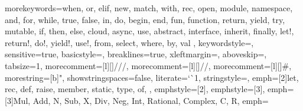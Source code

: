 




%
{
  morekeywords={when, or, elif, new, match, with, rec, open, module, namespace, %
    and, for, while, true, false, in, do, begin, end, fun, function, return, yield, try, %
    mutable, if, then, else, cloud, async, use, abstract, interface, inherit, finally,
    let!, return!, do!, yield!, use!, from, select, where, by, val },
  keywordstyle=\color{codepurple},
  sensitive=true,
  basicstyle=\ttfamily\footnotesize,
  breaklines=true,
  xleftmargin=\parindent,
  aboveskip=\bigskipamount,
  tabsize=1,
  morecomment=[l][\color{greencomments}]{///},
  morecomment=[l][\color{greencomments}]{//},
  morecomment=[l][\color{greencomments}]{\#},
  morestring=[b]",
  showstringspaces=false,
  literate={`}{\`}1,
  stringstyle=\color{greencomments},
  emph={[2]let, rec, def, raise, member, static, type, of, }, %
  emphstyle={[2]\color{bluekeywords}},
  emphstyle={[3]\color{liteblue}},
  emph={[3]Mul, Add, N, Sub, X, Div, Neg, Int, Rational, Complex, C, R},
  emph={
}}
